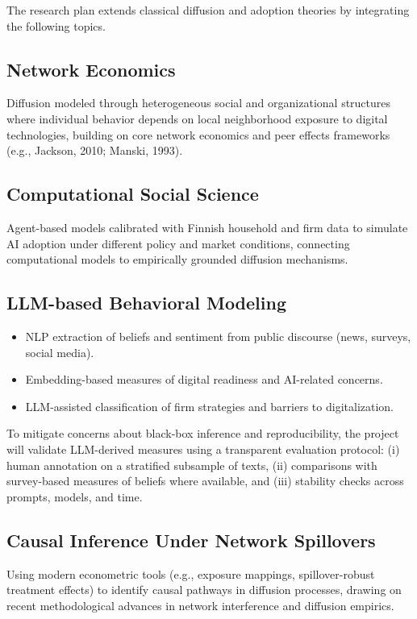 \documentclass{nfr}
\begin{document}
The research plan extends classical diffusion and adoption theories by integrating the following topics.

\subsection{Network Economics}
Diffusion modeled through heterogeneous social and organizational structures where individual behavior depends on local neighborhood exposure to digital technologies, building on core network economics and peer effects frameworks (e.g., Jackson, 2010; Manski, 1993).

\subsection{Computational Social Science}
Agent-based models calibrated with Finnish household and firm data to simulate AI adoption under different policy and market conditions, connecting computational models to empirically grounded diffusion mechanisms.

\subsection{LLM-based Behavioral Modeling}
\begin{itemize}
\item NLP extraction of beliefs and sentiment from public discourse (news, surveys, social media).
\item Embedding-based measures of digital readiness and AI-related concerns.
\item LLM-assisted classification of firm strategies and barriers to digitalization.
\end{itemize}

To mitigate concerns about black-box inference and reproducibility, the project will validate LLM-derived measures using a transparent evaluation protocol: (i) human annotation on a stratified subsample of texts, (ii) comparisons with survey-based measures of beliefs where available, and (iii) stability checks across prompts, models, and time.

\subsection{Causal Inference Under Network Spillovers}
Using modern econometric tools (e.g., exposure mappings, spillover-robust treatment effects) to identify causal pathways in diffusion processes, drawing on recent methodological advances in network interference and diffusion empirics.
\end{document}
